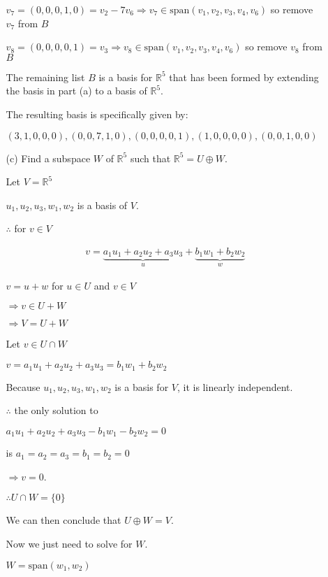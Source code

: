\documentclass[fleqn]{article}
\begin{document}
\begin{enumerate}[nolistsep]
\begin{enumerate}[nolistsep]
				$v_7 = (0, 0, 0, 1, 0) = v_2 - 7v_6 \Rightarrow v_7 \in \text{span}(v_1, v_2, v_3, v_4, v_6)$ so remove $v_7$ from $B$
				
				$v_8 = (0, 0, 0, 0, 1) = v_3 \Rightarrow v_8 \in \text{span}(v_1, v_2, v_3, v_4, v_6)$ so remove $v_8$ from $B$
				 
				 The remaining list $B$ is a basis for $\mathbb{R}^5$ that has been formed by extending the basis in part (a) to a basis of $\mathbb{R}^5$.
				 
				The resulting basis is specifically given by:
				
				$(3, 1, 0, 0, 0), (0, 0, 7, 1, 0), (0, 0, 0, 0, 1), (1, 0, 0, 0, 0), (0, 0, 1, 0, 0)$
					
				\item[(c)] Find a subspace $W$ of $\mathbb{R}^5$ such that $\mathbb{R}^5 = U \oplus W$.
				
				Let $V = \mathbb{R}^5$
				
				$u_1, u_2, u_3, w_1, w_2$ is a basis of $V$.
				
				$\therefore$ for $v \in V$
				
				\begin{align*}
				v = \underbrace{a_1u_1 + a_2u_2 + a_3u_3}_{u} + \underbrace{b_1w_1 + b_2w_2}_{w}
				\end{align*}
				
				$v = u + w$ for $u \in U$ and $v \in V$
				
				$\Rightarrow v \in U + W$
				
				$\Rightarrow V = U + W$
				
				Let $v \in U \cap W$
				
				$v = a_1u_1 + a_2u_2 + a_3u_3 = b_1w_1 + b_2w_2$
				
				Because $u_1, u_2, u_3, w_1, w_2$ is a basis for $V$, it is linearly independent.
				
				$\therefore$ the only solution to
				
				$a_1u_1 + a_2u_2 + a_3u_3 - b_1w_1 - b_2w_2 = 0$
				
				is $a_1 = a_2 = a_3 = b_1 = b_2 = 0$
				
				$\Rightarrow v = 0$.
				
				$\therefore U \cap W = \{0\}$
				
				We can then conclude that $U \oplus W = V$.
				
				Now we just need to solve for $W$.
				
				$W = \text{span}(w_1, w_2)$
				

\end{enumerate}
\end{enumerate}
\end{document}
